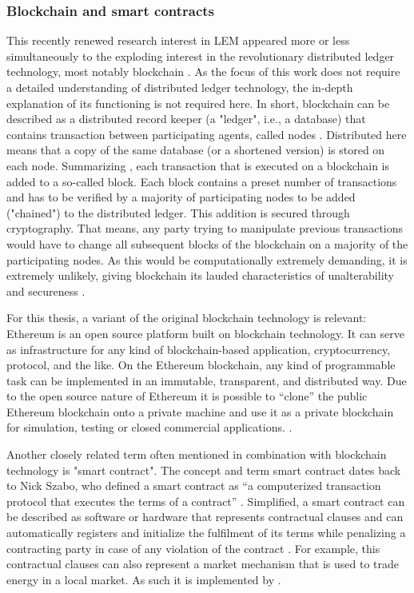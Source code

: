 \subsubsection{Blockchain and smart contracts}

This recently renewed research interest in LEM appeared more or less simultaneously to the exploding interest in the revolutionary distributed ledger technology, most notably blockchain \citep{Swan:2015}. As the focus of this work does not require a detailed understanding of distributed ledger technology, the in-depth explanation of its functioning is not required here. In short, blockchain can be described as a distributed record keeper (a "ledger", i.e., a database) that contains transaction between participating agents, called nodes \citep{Burger:2016}. Distributed here means that a copy of the same database (or a shortened version) is stored on each node. Summarizing \citet{Tapscott:2016}, each transaction that is executed on a blockchain is added to a so-called block. Each block contains a preset number of transactions and has to be verified by a majority of participating nodes to be added ("chained") to the distributed ledger. This addition is secured through cryptography. That means, any party trying to manipulate previous transactions would have to change all subsequent blocks of the blockchain on a majority of the participating nodes. As this would be computationally extremely demanding, it is extremely unlikely, giving blockchain its lauded characteristics of unalterability and secureness \citep{Burger:2016}.

For this thesis, a variant of the original blockchain technology is relevant: Ethereum is an open source platform built on blockchain technology. It can serve as infrastructure for any kind of blockchain-based application, cryptocurrency, protocol, and the like. On the Ethereum blockchain, any kind of programmable task can be implemented in an immutable, transparent, and distributed way. Due to the open source nature of Ethereum it is possible to “clone” the public Ethereum blockchain onto a private machine and use it as a private blockchain for simulation, testing or closed commercial applications. \citep{Ethereum:2018doc, Swan:2015}.

Another closely related term often mentioned in combination with blockchain technology is "smart contract". The concept and term smart contract dates back to Nick Szabo, who defined a smart contract as “a computerized transaction protocol that executes the terms of a contract” \citep{szabo:1994}. Simplified, a smart contract can be described as software or hardware that represents contractual clauses and can automatically registers and initialize the fulfilment of its terms while penalizing a contracting party in case of any violation of the contract \citep{Szabo:1997}. For example, this contractual clauses can also represent a market mechanism that is used to trade energy in a local market. As such it is implemented by \citet{Mengelkamp:2018a}.


